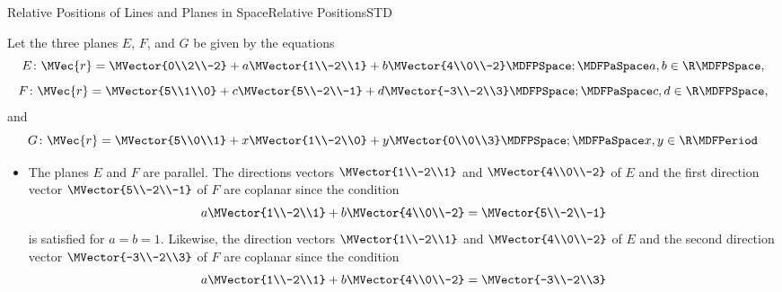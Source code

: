\begin{MXContent}{Relative Positions of Lines and Planes in Space}{Relative Positions}{STD}
\begin{MExample}
Let the three planes $E$, $F$, and $G$ be given by the equations
\[
 E\colon\MVec{r}=\MVector{0\\2\\-2}+a\MVector{1\\-2\\1}+b\MVector{4\\0\\-2}\MDFPSpace;\MDFPaSpace a,b\in\R\MDFPSpace,
\]
\[
 F\colon\MVec{r}=\MVector{5\\1\\0}+c\MVector{5\\-2\\-1}+d\MVector{-3\\-2\\3}\MDFPSpace;\MDFPaSpace c,d\in\R\MDFPSpace,
\]
and
\[
 G\colon\MVec{r}=\MVector{5\\0\\1}+x\MVector{1\\-2\\0}+y\MVector{0\\0\\3}\MDFPSpace;\MDFPaSpace x,y\in\R \MDFPeriod
\]
\begin{itemize}
 \item The planes $E$ and $F$ are parallel. The directions vectors $\MVector{1\\-2\\1}$ and $\MVector{4\\0\\-2}$ of $E$ 
  and the first direction vector $\MVector{5\\-2\\-1}$ of $F$ are coplanar since the condition 
 \[
  a\MVector{1\\-2\\1}+b\MVector{4\\0\\-2}=\MVector{5\\-2\\-1}
 \]
 is satisfied for $a=b=1$. Likewise, the direction vectors $\MVector{1\\-2\\1}$ and $\MVector{4\\0\\-2}$ of 
 $E$ and the second direction vector $\MVector{-3\\-2\\3}$ of $F$ are coplanar since the condition 
 \[
  a\MVector{1\\-2\\1}+b\MVector{4\\0\\-2}=\MVector{-3\\-2\\3}
\]
\end{itemize}
\end{MExample}
\end{MXContent}
